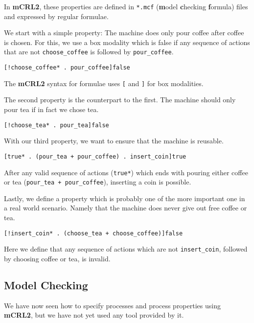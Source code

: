\documentclass{clseminar}
\begin{document}
  In \textbf{mCRL2}, these properties are defined in \texttt{*.mcf} (\textbf{m}odel \textbf{c}hecking \textbf{f}ormula) files and expressed by regular formulae.

  We start with a simple property: The machine does only pour coffee after coffee is chosen. For this, we use a box modality which is false if any sequence of actions that are not \texttt{choose\_coffee} is followed by \texttt{pour\_coffee}.

  \begin{lstlisting}[language=mCRL2]
[!choose_coffee* . pour_coffee]false
  \end{lstlisting}

  The \textbf{mCRL2} syntax for formulae uses \texttt{[} and \texttt{]} for box modalities.

  The second property is the counterpart to the first. The machine should only pour tea if in fact we chose tea.

  \begin{lstlisting}[language=mCRL2]
[!choose_tea* . pour_tea]false
  \end{lstlisting}

  With our third property, we want to ensure that the machine is reusable.

  \begin{lstlisting}[language=mCRL2]
[true* . (pour_tea + pour_coffee) . insert_coin]true
  \end{lstlisting}

  After any valid sequence of actions (\texttt{true*}) which ends with pouring either coffee or tea (\texttt{pour\_tea + pour\_coffee}), inserting a coin is possible.

  Lastly, we define a property which is probably one of the more important one in a real world scenario. Namely that the machine does never give out free coffee or tea.

  \begin{lstlisting}[language=mCRL2]
[!insert_coin* . (choose_tea + choose_coffee)]false
  \end{lstlisting}

  Here we define that any sequence of actions which are not \texttt{insert\_coin}, followed by choosing coffee or tea, is invalid.

  \subsection{Model Checking}

  We have now seen how to specify processes and process properties using \textbf{mCRL2}, but we have not yet used any tool provided by it.
\end{document}
